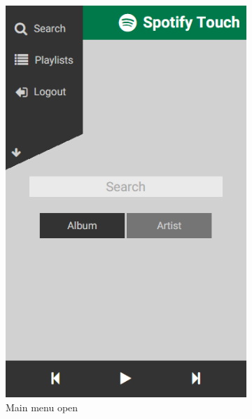 \documentclass[conference]{IEEEtran}
\begin{document}
\begin{figure}[htbp]
\begin{subfigure}{0.45\columnwidth}
        \includegraphics[width=0.9\linewidth]{spotify_menu.png}
        \caption{Main menu open}
        \label{fig:MenuView}
    \end{subfigure}
    \begin{subfigure}{0.45\columnwidth}
        \centering

\end{subfigure}
\end{figure}
\end{document}
